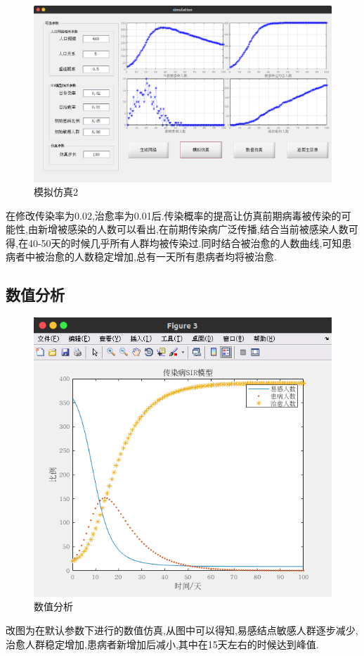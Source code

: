 \documentclass[supercite]{HustGraduPaper}
\begin{document}
	\begin{figure}[H]
		\centering
		\includegraphics[scale=0.35]{Figures/moni2.png}
		\caption{模拟仿真2}
	\end{figure} 
	在修改传染率为0.02,治愈率为0.01后.传染概率的提高让仿真前期病毒被传染的可能性,由新增被感染的人数可以看出,在前期传染病广泛传播,结合当前被感染人数可得,在40-50天的时候几乎所有人群均被传染过.同时结合被治愈的人数曲线,可知患病者中被治愈的人数稳定增加,总有一天所有患病者均将被治愈.

	\subsection{数值分析}
	\begin{figure}[H]
		\centering
		\includegraphics[scale=0.5]{Figures/shuzhi.png}
		\caption{数值分析}
	\end{figure} 
	改图为在默认参数下进行的数值仿真,从图中可以得知,易感结点敏感人群逐步减少,治愈人群稳定增加,患病者新增加后减小,其中在15天左右的时候达到峰值. \par
\end{document}
